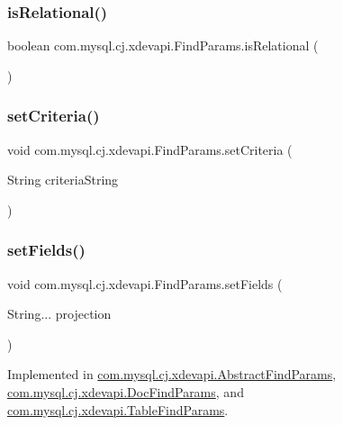 \subsubsection{\texorpdfstring{is\+Relational()}{isRelational()}}
{\footnotesize\ttfamily boolean com.\+mysql.\+cj.\+xdevapi.\+Find\+Params.\+is\+Relational (\begin{DoxyParamCaption}{ }\end{DoxyParamCaption})}

\mbox{\label{interfacecom_1_1mysql_1_1cj_1_1xdevapi_1_1_find_params_a2d60a8c39a0b533be609e3755eb43dd1}} 
\subsubsection{\texorpdfstring{set\+Criteria()}{setCriteria()}}
{\footnotesize\ttfamily void com.\+mysql.\+cj.\+xdevapi.\+Find\+Params.\+set\+Criteria (\begin{DoxyParamCaption}\item[{String}]{criteria\+String }\end{DoxyParamCaption})}

\mbox{\label{interfacecom_1_1mysql_1_1cj_1_1xdevapi_1_1_find_params_a8326dbc363863872a177b89345f6f419}} 
\subsubsection{\texorpdfstring{set\+Fields()}{setFields()}}
{\footnotesize\ttfamily void com.\+mysql.\+cj.\+xdevapi.\+Find\+Params.\+set\+Fields (\begin{DoxyParamCaption}\item[{String...}]{projection }\end{DoxyParamCaption})}



Implemented in \mbox{\hyperlink{classcom_1_1mysql_1_1cj_1_1xdevapi_1_1_abstract_find_params_a65e9b75d89ac2fa9d13280bcba7404f3}{com.\+mysql.\+cj.\+xdevapi.\+Abstract\+Find\+Params}}, \mbox{\hyperlink{classcom_1_1mysql_1_1cj_1_1xdevapi_1_1_doc_find_params_a01e55531bef9b0d461c559257f5b6b0c}{com.\+mysql.\+cj.\+xdevapi.\+Doc\+Find\+Params}}, and \mbox{\hyperlink{classcom_1_1mysql_1_1cj_1_1xdevapi_1_1_table_find_params_a94e20b606a6c17ac6990fab5c212555b}{com.\+mysql.\+cj.\+xdevapi.\+Table\+Find\+Params}}.

